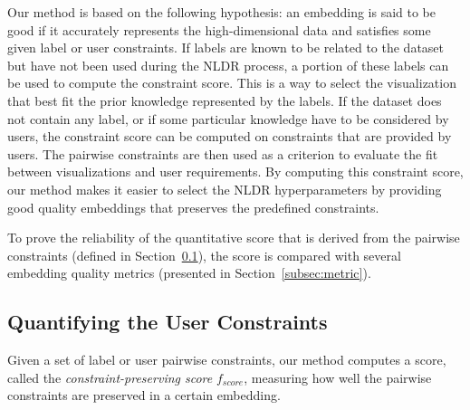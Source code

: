 Our method is based on the following hypothesis: an embedding is said to be good if it accurately represents the high-dimensional data and satisfies some given label or user constraints. If labels are known to be related to the dataset but have not been used during the NLDR process, a portion of these labels can be used to compute the constraint score. This is a way to select the visualization that best fit the prior knowledge represented by the labels. If the dataset does not contain any label, or if some particular knowledge have to be considered by users, the constraint score can be computed on constraints that are provided by users. The pairwise constraints are then used as a criterion to evaluate the fit between visualizations and user requirements.
By computing this constraint score, our method makes it easier to select the NLDR hyperparameters by providing good quality embeddings that preserves the predefined constraints.

To prove the reliability of the quantitative score that is derived from the pairwise constraints (defined in Section~\ref{subsec:s_score}), the score is compared with several embedding quality metrics (presented in Section~\ref{subsec:metric}).

\subsection{Quantifying the User Constraints}\label{subsec:s_score}

Given a set of label or user pairwise constraints, our method computes a score, called the \emph{constraint-preserving score} $f_{score}$, measuring how well the pairwise constraints are preserved in a certain embedding.

